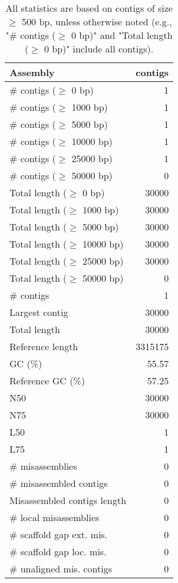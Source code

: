 \documentclass[12pt,a4paper]{article}
\begin{document}
\begin{table}[ht]
\begin{center}
\caption{All statistics are based on contigs of size $\geq$ 500 bp, unless otherwise noted (e.g., "\# contigs ($\geq$ 0 bp)" and "Total length ($\geq$ 0 bp)" include all contigs).}
\begin{tabular}{|l*{1}{|r}|}
\hline
Assembly & contigs \\ \hline
\# contigs ($\geq$ 0 bp) & 1 \\ \hline
\# contigs ($\geq$ 1000 bp) & 1 \\ \hline
\# contigs ($\geq$ 5000 bp) & 1 \\ \hline
\# contigs ($\geq$ 10000 bp) & 1 \\ \hline
\# contigs ($\geq$ 25000 bp) & 1 \\ \hline
\# contigs ($\geq$ 50000 bp) & 0 \\ \hline
Total length ($\geq$ 0 bp) & 30000 \\ \hline
Total length ($\geq$ 1000 bp) & 30000 \\ \hline
Total length ($\geq$ 5000 bp) & 30000 \\ \hline
Total length ($\geq$ 10000 bp) & 30000 \\ \hline
Total length ($\geq$ 25000 bp) & 30000 \\ \hline
Total length ($\geq$ 50000 bp) & 0 \\ \hline
\# contigs & 1 \\ \hline
Largest contig & 30000 \\ \hline
Total length & 30000 \\ \hline
Reference length & 3315175 \\ \hline
GC (\%) & 55.57 \\ \hline
Reference GC (\%) & 57.25 \\ \hline
N50 & 30000 \\ \hline
N75 & 30000 \\ \hline
L50 & 1 \\ \hline
L75 & 1 \\ \hline
\# misassemblies & 0 \\ \hline
\# misassembled contigs & 0 \\ \hline
Misassembled contigs length & 0 \\ \hline
\# local misassemblies & 0 \\ \hline
\# scaffold gap ext. mis. & 0 \\ \hline
\# scaffold gap loc. mis. & 0 \\ \hline
\# unaligned mis. contigs & 0 \\ \hline

\end{tabular}
\end{center}
\end{table}
\end{document}
